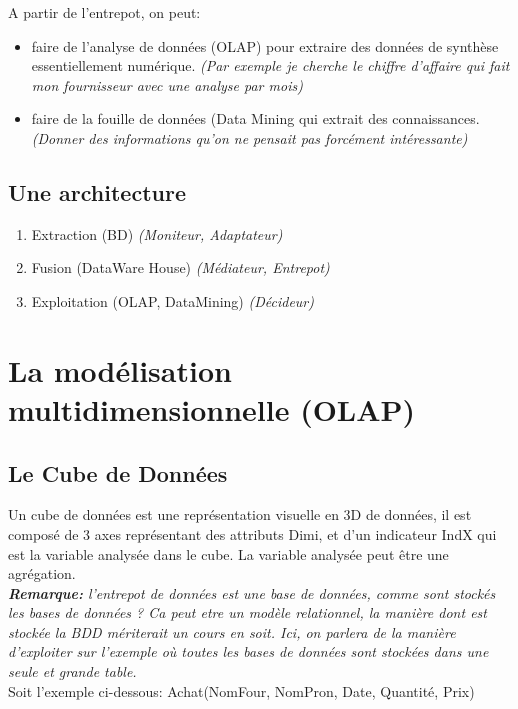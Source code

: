 \documentclass[a4paper,11pt]{article}
\begin{document}
		A partir de l'entrepot, on peut:
		\begin{itemize}
			\item faire de l'analyse de données (OLAP) pour extraire des données de synthèse essentiellement numérique. \emph{(Par exemple je cherche le chiffre d'affaire qui fait mon fournisseur avec une analyse par mois)}
			\item faire de la fouille de données (Data Mining qui extrait des connaissances. \emph{(Donner des informations qu'on ne pensait pas forcément intéressante)}
		\end{itemize}
		
		\subsection{Une architecture}
		\begin{enumerate}
			\item Extraction (BD) \emph{(Moniteur, Adaptateur)}
			\item Fusion (DataWare House) \emph{(Médiateur, Entrepot)}
			\item Exploitation (OLAP, DataMining) \emph{(Décideur)}
		\end{enumerate}
			
	\section{La modélisation multidimensionnelle (OLAP)}
		\subsection{Le Cube de Données}
		Un cube de données est une représentation visuelle en 3D de données, il est composé de 3 axes représentant des attributs Dimi, et d'un indicateur IndX qui est la variable analysée dans le cube. La variable analysée peut être une agrégation.\\
		
		\emph{\textbf{Remarque:} l'entrepot de données est une base de données, comme sont stockés les bases de données ? Ca peut etre un modèle relationnel, la manière dont est stockée la BDD mériterait un cours en soit. Ici, on parlera de la manière d'exploiter sur l'exemple où toutes les bases de données sont stockées dans une seule et grande table.}\\
		
		Soit l'exemple ci-dessous: Achat(NomFour, NomPron, Date, Quantité, Prix)\\
		
\end{document}
